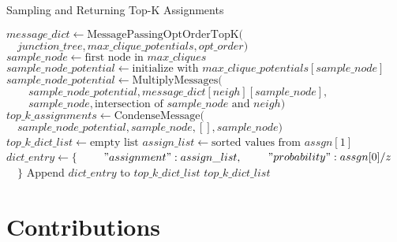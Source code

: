 \documentclass[12pt]{article}
\begin{document}
\begin{algorithm}
    \caption{Sampling and Returning Top-K Assignments}
    \begin{algorithmic}[1]
    \State $message\_dict \gets \text{MessagePassingOptOrderTopK}($
    \State $\quad junction\_tree, max\_clique\_potentials, opt\_order)$
    \State $sample\_node \gets \text{first node in } max\_cliques$
    \State $sample\_node\_potential \gets \text{initialize with } max\_clique\_potentials[sample\_node]$
        \State $sample\_node\_potential \gets \text{MultiplyMessages} ($
        \State $\qquad sample\_node\_potential, message\_dict[neigh][sample\_node],$
        \State $\qquad sample\_node, \text{intersection of } sample\_node \text{ and }neigh)$
    \EndFor
    \State $top\_k\_assignments \gets \text{CondenseMessage}($
    \State $\quad sample\_node\_potential, sample\_node, [], sample\_node)$
    \State $top\_k\_dict\_list \gets \text{empty list}$
        \State $assign\_list \gets \text{sorted values from } assgn[1]$
        \State $dict\_entry \gets \{$
        \State $\qquad "assignment": assign\_list,$
        \State $\qquad "probability": assgn[0] / z$
        \State $\quad \}$
        \State Append $dict\_entry$ to $top\_k\_dict\_list$
    \EndFor
    \State \Return $top\_k\_dict\_list$
    \end{algorithmic}
\end{algorithm}

\newpage

\section*{Contributions}
\end{document}
